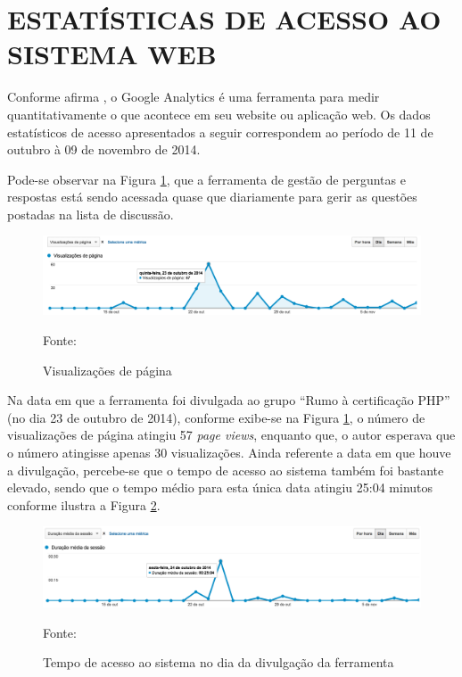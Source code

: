 \section{ESTATÍSTICAS DE ACESSO AO SISTEMA WEB}

Conforme afirma , o \acs{Google Analytics} é uma
ferramenta para medir quantitativamente o que acontece em seu website ou
aplicação  web. Os dados estatísticos de acesso apresentados a seguir 
correspondem ao período de 11 de outubro à 09 de novembro de 2014.

Pode-se observar na Figura \ref{fig:googleAnalyticsGrafico}, que a
ferramenta de gestão de perguntas e respostas está sendo acessada quase
que diariamente para gerir as questões postadas na lista de discussão.

\begin{figure}[h!tb]
	\caption{Visualizações de página}
	\label{fig:googleAnalyticsGrafico}

	\centering
	\includegraphics[width=\textwidth]{images/resultados/google-analytics-grafico.png}

	\centering
	\footnotesize Fonte: \fonteOAutor
\end{figure}

\FloatBarrier 	%

Na data em que a ferramenta foi divulgada ao grupo ``Rumo à certificação PHP''
(no dia 23 de outubro de 2014), conforme exibe-se na Figura
\ref{fig:googleAnalyticsGrafico}, o número de visualizações de página atingiu 
57 \textit{page views}, enquanto que, o autor esperava que o número atingisse
apenas 30 visualizações. Ainda referente a data em que houve a divulgação, 
percebe-se que o tempo de acesso ao sistema também foi bastante elevado, sendo
que o tempo médio para esta única data atingiu 25:04 minutos conforme ilustra a 
Figura \ref{fig:googleAnalyticsTempoAcessoDivulgacao}.

\begin{figure}[h!tb]
	\caption{Tempo de acesso ao sistema no dia da divulgação da ferramenta}
	\label{fig:googleAnalyticsTempoAcessoDivulgacao}

	\centering
	\includegraphics[width=\textwidth]{images/resultados/google-analytics-tempoacesso-divulgacao.png}

	\centering
	\footnotesize Fonte: \fonteOAutor
\end{figure}

